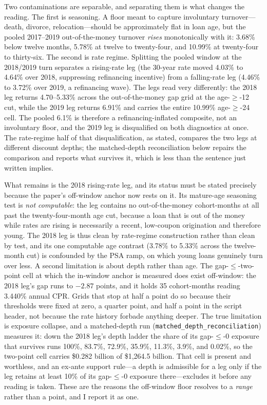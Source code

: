 \documentclass[12pt]{article}
\begin{document}
Two contaminations are separable, and separating them is what changes the reading. The first is seasoning. A floor meant to capture involuntary turnover---death, divorce, relocation---should be approximately flat in loan age, but the pooled 2017--2019 out-of-the-money turnover \emph{rises} monotonically with it: 3.68\% below twelve months, 5.78\% at twelve to twenty-four, and 10.99\% at twenty-four to thirty-six. The second is rate regime. Splitting the pooled window at the 2018/2019 turn separates a rising-rate leg (the 30-year rate moved 4.03\% to 4.64\% over 2018, suppressing refinancing incentive) from a falling-rate leg (4.46\% to 3.72\% over 2019, a refinancing wave). The legs read very differently: the 2018 leg returns 4.70--5.33\% across the out-of-the-money gap grid at the age-$\geq$-12 cut, while the 2019 leg returns 6.91\% and carries the entire 10.99\% age-$\geq$-24 cell. The pooled 6.1\% is therefore a refinancing-inflated composite, not an involuntary floor, and the 2019 leg is disqualified on both diagnostics at once. The rate-regime half of that disqualification, as stated, compares the two legs at different discount depths; the matched-depth reconciliation below repairs the comparison and reports what survives it, which is less than the sentence just written implies.

What remains is the 2018 rising-rate leg, and its status must be stated precisely because the paper's off-window anchor now rests on it. Its mature-age seasoning test is \emph{not computable}: the leg contains no out-of-the-money cohort-months at all past the twenty-four-month age cut, because a loan that is out of the money while rates are rising is necessarily a recent, low-coupon origination and therefore young. The 2018 leg is thus clean by rate-regime construction rather than clean by test, and its one computable age contrast (3.78\% to 5.33\% across the twelve-month cut) is confounded by the PSA ramp, on which young loans genuinely turn over less. A second limitation is about depth rather than age. The gap-$\leq$-two-point cell at which the in-window anchor is measured does exist off-window: the 2018 leg's gap runs to $-2.87$ points, and it holds 35 cohort-months reading 3.440\% annual CPR. Grids that stop at half a point do so because their thresholds were fixed at zero, a quarter point, and half a point in the script header, not because the rate history forbade anything deeper. The true limitation is exposure collapse, and a matched-depth run (\texttt{matched\_depth\_reconciliation}) measures it: down the 2018 leg's depth ladder the share of its gap-$\leq$-0 exposure that survives runs 100\%, 83.7\%, 72.9\%, 35.9\%, 11.3\%, 3.9\%, and 0.02\%, so the two-point cell carries \$0.282 billion of \$1{,}264.5 billion. That cell is present and worthless, and an ex-ante support rule---a depth is admissible for a leg only if the leg retains at least 10\% of its gap-$\leq$-0 exposure there---excludes it before any reading is taken. These are the reasons the off-window floor resolves to a \emph{range} rather than a point, and I report it as one.
\end{document}
